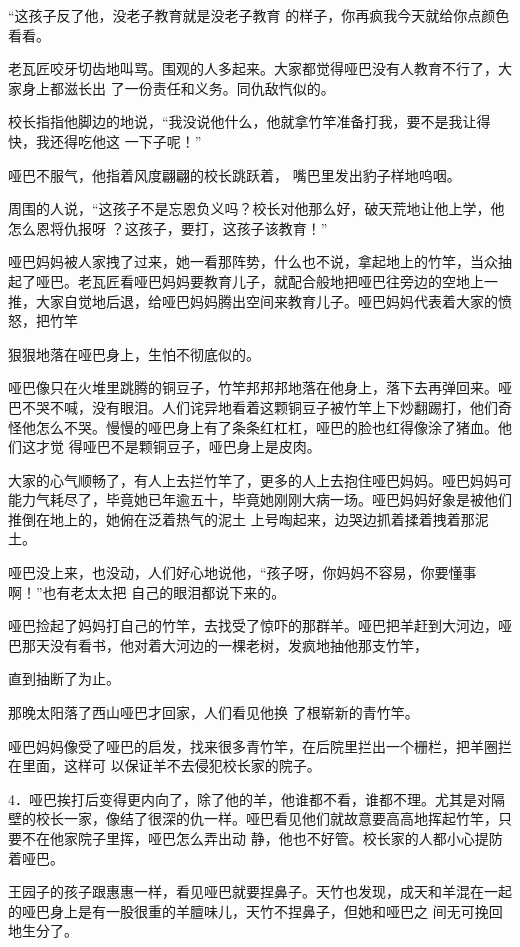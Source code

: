\documentclass{article}
\begin{document}
“这孩子反了他，没老子教育就是没老子教育
的样子，你再疯我今天就给你点颜色看看。 

\newpage

老瓦匠咬牙切齿地叫骂。围观的人多起来。大家都觉得哑巴没有人教育不行了，大家身上都滋长出
了一份责任和义务。同仇敌忾似的。 

校长指指他脚边的地说，“我没说他什么，他就拿竹竿准备打我，要不是我让得快，我还得吃他这
一下子呢！” 

哑巴不服气，他指着风度翩翩的校长跳跃着，
嘴巴里发出豹子样地呜咽。 

周围的人说，“这孩子不是忘恩负义吗？校长对他那么好，破天荒地让他上学，他怎么恩将仇报呀
？这孩子，要打，这孩子该教育！” 

哑巴妈妈被人家拽了过来，她一看那阵势，什么也不说，拿起地上的竹竿，当众抽起了哑巴。老瓦匠看哑巴妈妈要教育儿子，就配合般地把哑巴往旁边的空地上一推，大家自觉地后退，给哑巴妈妈腾出空间来教育儿子。哑巴妈妈代表着大家的愤怒，把竹竿

\newpage
狠狠地落在哑巴身上，生怕不彻底似的。 

哑巴像只在火堆里跳腾的铜豆子，竹竿邦邦邦地落在他身上，落下去再弹回来。哑巴不哭不喊，没有眼泪。人们诧异地看着这颗铜豆子被竹竿上下炒翻踢打，他们奇怪他怎么不哭。慢慢的哑巴身上有了条条红杠杠，哑巴的脸也红得像涂了猪血。他们这才觉
得哑巴不是颗铜豆子，哑巴身上是皮肉。 

大家的心气顺畅了，有人上去拦竹竿了，更多的人上去抱住哑巴妈妈。哑巴妈妈可能力气耗尽了，毕竟她已年逾五十，毕竟她刚刚大病一场。哑巴妈妈好象是被他们推倒在地上的，她俯在泛着热气的泥土
上号啕起来，边哭边抓着揉着拽着那泥土。 

哑巴没上来，也没动，人们好心地说他，“孩子呀，你妈妈不容易，你要懂事啊！”也有老太太把
自己的眼泪都说下来的。 

哑巴捡起了妈妈打自己的竹竿，去找受了惊吓的那群羊。哑巴把羊赶到大河边，哑巴那天没有看书，他对着大河边的一棵老树，发疯地抽他那支竹竿，
\newpage

直到抽断了为止。 

那晚太阳落了西山哑巴才回家，人们看见他换
了根崭新的青竹竿。 

哑巴妈妈像受了哑巴的启发，找来很多青竹竿，在后院里拦出一个栅栏，把羊圈拦在里面，这样可
以保证羊不去侵犯校长家的院子。 

4．哑巴挨打后变得更内向了，除了他的羊，他谁都不看，谁都不理。尤其是对隔壁的校长一家，像结了很深的仇一样。哑巴看见他们就故意要高高地挥起竹竿，只要不在他家院子里挥，哑巴怎么弄出动
静，他也不好管。校长家的人都小心提防着哑巴。 

王园子的孩子跟惠惠一样，看见哑巴就要捏鼻子。天竹也发现，成天和羊混在一起的哑巴身上是有一股很重的羊膻味儿，天竹不捏鼻子，但她和哑巴之
间无可挽回地生分了。 
\end{document}
